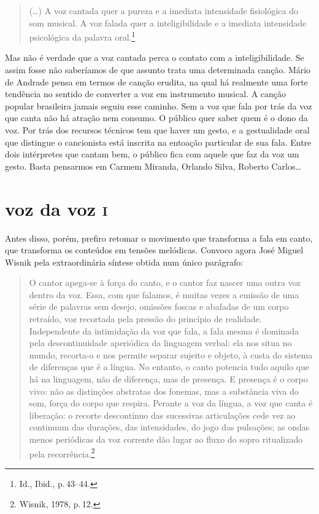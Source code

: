 \begin{quote}
(\ldots) A voz cantada quer a pureza e a imediata intensidade fisiológica
do som musical. A voz falada quer a inteligibilidade e a imediata
intensidade psicológica da palavra oral.\footnote{Id., Ibid., p.\,43--44.}
\end{quote}

Mas não é verdade que a voz cantada perca o contato com a
inteligibilidade. Se assim fosse não saberíamos de que assunto trata uma
determinada canção. Mário de Andrade pensa em termos de canção erudita,
na qual há realmente uma forte tendência no sentido de converter a voz
em instrumento musical. A canção popular brasileira jamais seguiu esse
caminho. Sem a voz que fala por trás da voz que canta não há atração nem
consumo. O público quer saber quem é o dono da voz. Por trás dos
recursos técnicos tem que haver um gesto, e a gestualidade oral que
distingue o cancionista está inscrita na entoação particular de sua
fala. Entre dois intérpretes que cantam bem, o público fica com aquele
que faz da voz um gesto. Basta pensarmos em Carmem Miranda, Orlando
Silva, Roberto Carlos\ldots

\section{voz da voz \textsc{i}}

Antes disso, porém, prefiro retomar o movimento que transforma a fala em
canto, que transforma os conteúdos em tensões melódicas. Convoco agora
José Miguel Wisnik pela extraordinária síntese obtida num único
parágrafo:

\begin{quote}
O cantor apega-se à força do canto, e o cantor faz nascer uma outra voz
dentro da voz. Essa, com que falamos, é muitas vezes a emissão de uma
série de palavras sem desejo, omissões foscas e abafadas de um corpo
retraído, voz recortada pela pressão do princípio de realidade.
Independente da intimidação da voz que fala, a fala mesma é dominada
pela descontinuidade aperiódica da linguagem verbal: ela nos situa no
mundo, recorta-o e nos permite separar sujeito e objeto, à custa do
sistema de diferenças que é a língua. No entanto, o canto potencia tudo
aquilo que há na linguagem, não de diferença, mas de presença. E
presença é o corpo vivo: não as distinções abstratas dos fonemas, mas a
substância viva do som, força do corpo que respira. Perante a voz da
língua, a voz que canta é liberação: o recorte descontínuo das
sucessivas articulações cede vez ao continuum das durações, das
intensidades, do jogo das pulsações; as ondas menos periódicas da voz
corrente dão lugar ao fluxo do sopro ritualizado pela recorrência.\footnote{Wisnik, 1978, p.\,12.}
\end{quote}

